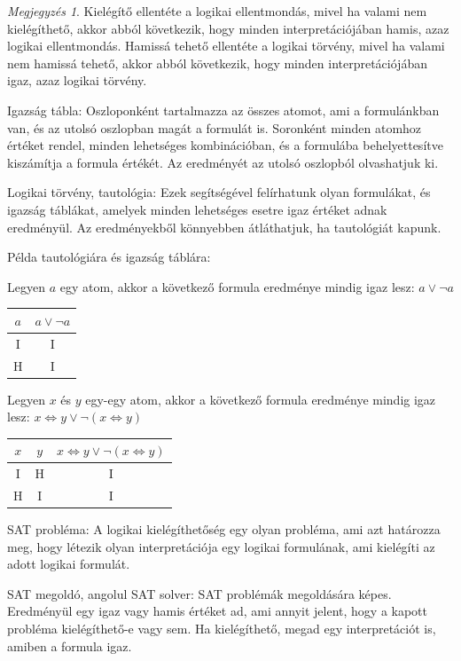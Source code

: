 \documentclass[
]{thesis-ekf}
\theoremstyle{definition}
\theoremstyle{remark}
\newtheorem{megjegyzes}[tetel]{Megjegyzés}
\begin{document}
\begin{megjegyzes}
	Kielégítő ellentéte a logikai ellentmondás, mivel ha valami nem kielégíthető, akkor abból következik, hogy minden interpretációjában hamis, azaz logikai ellentmondás.
	Hamissá tehető ellentéte a logikai törvény, mivel ha valami nem hamissá tehető, akkor abból következik, hogy minden interpretációjában igaz, azaz logikai törvény.
\end{megjegyzes}

Igazság tábla: Oszloponként tartalmazza az összes atomot, ami a formulánkban van, és az utolsó oszlopban magát a formulát is. Soronként minden atomhoz értéket rendel, minden lehetséges kombinációban, és a formulába behelyettesítve kiszámítja a formula értékét. Az eredményét az utolsó oszlopból olvashatjuk ki.

Logikai törvény, tautológia: Ezek segítségével felírhatunk olyan formulákat, és igazság táblákat, amelyek minden lehetséges esetre igaz értéket adnak eredményül. Az eredményekből könnyebben átláthatjuk, ha tautológiát kapunk.

\label{pelda-tautologia}
	Példa tautológiára és igazság táblára: 
		
	Legyen $ a $ egy atom, akkor a következő formula eredménye mindig igaz lesz: $ a\vee\neg a $
	
	\begin{tabular}{|c|c|}
		\hline
		$ a $ & $ a\vee\neg a $ \\
		\hline
		I & I \\
		\hline
		H & I \\
		\hline
	\end{tabular}

	Legyen $ x $ és $ y $ egy-egy atom, akkor a következő formula eredménye mindig igaz lesz: $ x \Leftrightarrow y\vee \neg(x\Leftrightarrow y) $
	
	\begin{tabular}{|c|c|c|}
		\hline
		$ x $ & $ y $ & $ x\Leftrightarrow y\vee\neg(x\Leftrightarrow y) $ \\
		\hline
		I & H & I \\
		\hline
		H & I & I \\
		\hline
	\end{tabular}

\textsc{SAT} probléma: A logikai kielégíthetőség egy olyan probléma, ami azt határozza meg, hogy létezik olyan interpretációja egy logikai formulának, ami kielégíti az adott logikai formulát.

\textsc{SAT} megoldó, angolul \textsc{SAT} solver: \textsc{SAT} problémák megoldására képes. Eredményül egy igaz vagy hamis értéket ad, ami annyit jelent, hogy a kapott probléma kielégíthető-e vagy sem. Ha kielégíthető, megad egy interpretációt is, amiben a formula igaz.
\end{document}
